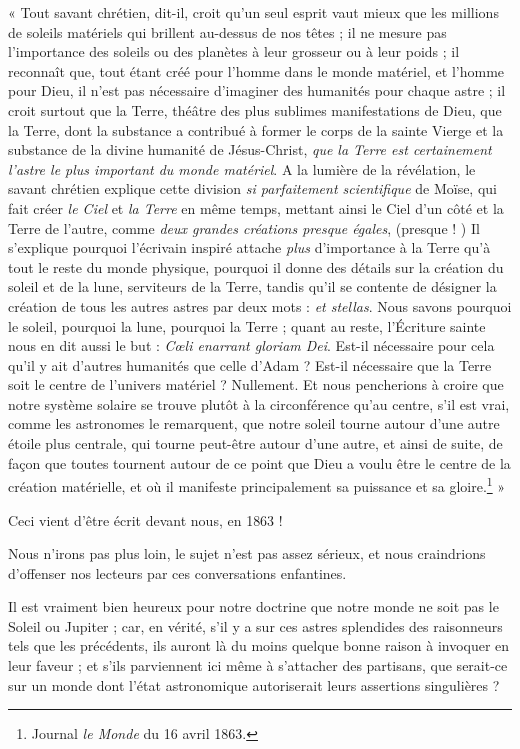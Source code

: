 \documentclass[a4paper, 11pt, oneside, landscape]{article}
\begin{document}
« Tout savant chrétien, dit-il, croit qu'un seul esprit vaut mieux que les millions de soleils matériels qui brillent au-dessus de nos têtes ; il ne mesure pas l'importance des soleils ou des planètes à leur grosseur ou à leur poids ; il reconnaît que, tout étant créé pour l'homme dans le monde matériel, et l'homme pour Dieu, il n'est pas nécessaire d'imaginer des humanités pour chaque astre ; il croit surtout que la Terre, théâtre des plus sublimes manifestations de Dieu, que la Terre, dont la substance a contribué à former le corps de la sainte Vierge et la substance de la divine humanité de Jésus-Christ, \emph{que la Terre est certainement l'astre le plus important du monde matériel}. A la lumière de la révélation, le savant chrétien explique cette division \emph{si parfaitement scientifique} de Moïse, qui fait créer \emph{le Ciel} et \emph{la Terre} en même temps, mettant ainsi le Ciel d'un côté et la Terre de l'autre, comme \emph{deux grandes créations presque égales}, (presque ! ) Il s'explique pourquoi l'écrivain inspiré attache \emph{plus} d'importance à la Terre qu'à tout le reste du monde physique, pourquoi il donne des détails sur la création du soleil et de la lune, serviteurs de la Terre, tandis qu'il se contente de désigner la création de tous les autres astres par deux mots : \emph{et stellas}. Nous savons pourquoi le soleil, pourquoi la lune, pourquoi la Terre ; quant au reste, l'Écriture sainte nous en dit aussi le but : \emph{Cœli enarrant gloriam Dei}. Est-il nécessaire pour cela qu'il y ait d'autres humanités que celle d'Adam ? Est-il nécessaire que la Terre soit le centre de l'univers matériel ? Nullement. Et nous pencherions à croire que notre système solaire se trouve plutôt à la circonférence qu'au centre, s'il est vrai, comme les astronomes le remarquent, que notre soleil tourne autour d'une autre étoile plus centrale, qui tourne peut-être autour d'une autre, et ainsi de suite, de façon que toutes tournent autour de ce point que Dieu a voulu être le centre de la création matérielle, et où il manifeste principalement sa puissance et sa gloire.\footnote{Journal \emph{le Monde} du 16 avril 1863.} »

Ceci vient d'être écrit devant nous, en 1863 !

Nous n'irons pas plus loin, le sujet n'est pas assez sérieux, et nous craindrions d'offenser nos lecteurs par ces conversations enfantines.

Il est vraiment bien heureux pour notre doctrine que notre monde ne soit pas le Soleil ou Jupiter ; car, en vérité, s'il y a sur ces astres splendides des raisonneurs tels que les précédents, ils auront là du moins quelque bonne raison à invoquer en leur faveur ; et s'ils parviennent ici même à s'attacher des partisans, que serait-ce sur un monde dont l'état astronomique autoriserait leurs assertions singulières ?
\end{document}
